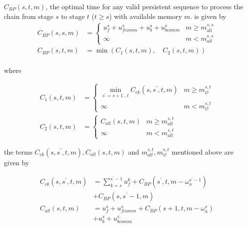 \begin{theorem}
    $C_{BP} (s, t, m)$, the optimal time for any valid persistent sequence to process the chain from stage $s$ to stage $t$ ($t \geq s$) with available memory $m$. is given by
    \begin{equation}
        \begin{aligned}
            C_{BP}(s, s, m) & = \begin{cases}u_f^s + u_{fcomm}^s + u_b^s + u_{bcomm}^s & m \geq m_{\text {all }}^{s, s} \\
            \infty & m<m_{a l l}^{s, s}\end{cases} \\
            C_{BP}(s, t, m) & =\min \left(C_1(s, t, m), \quad C_2(s, t, m)\right) \\
        \end{aligned}
    \end{equation}
    
    where

    \begin{equation}
        \begin{aligned}
            C_1(s, t, m) & = \begin{cases}\min _{s^{\prime}=s+1 \ldots t} C_{ck}\left(s, s^{\prime}, t, m\right) & m \geq m_{\varnothing}^{s, t} \\
            \infty & m<m_{\varnothing}^{s, t}\end{cases} \\
            C_2(s, t, m) & =\begin{cases}
            C_{all}(s, t, m) & m \geq m_{all}^{s, t} \\
            \infty & m<m_{all}^{s, t}
            \end{cases}
        \end{aligned}
    \end{equation}

    the terms $C_{ck}\left(s, s^{\prime}, t, m\right), C_{all}(s, t, m)$ and $m_{all}^{s, t}, m_{\varnothing}^{s, t}$ mentioned above are given by

    \begin{equation}
        \begin{aligned}
            C_{ck}\left(s, s^{\prime}, t, m\right) & =\sum_{k=s}^{s^{\prime}-1} u_f^k+C_{B P}\left(s^{\prime}, t, m-\omega_a^{s^{\prime}-1}\right) \\
            & + C_{B P}\left(s, s^{\prime}-1, m\right) \\
            C_{all}(s, t, m) & =u_f^s + u_{fcomm}^s + C_{B P}\left(s+1, t, m-\omega_{\bar{a}}^s\right) \\
            & + u_b^s + u_{bcomm}^s
        \end{aligned}
    \end{equation}


\end{theorem}

